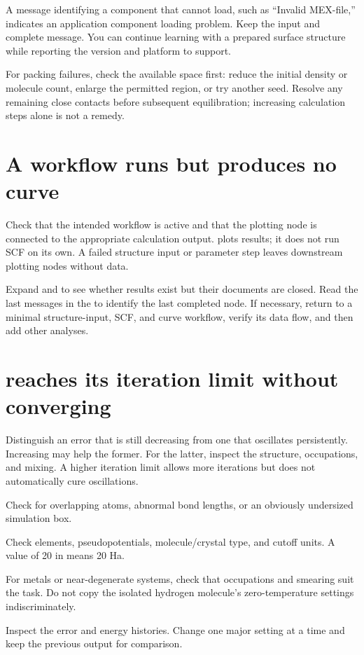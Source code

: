 A message identifying a component that cannot load, such as ``Invalid MEX-file,'' indicates an application component loading problem. Keep the input and complete message. You can continue learning with a prepared surface structure while reporting the version and platform to support.

For packing failures, check the available space first: reduce the initial density or molecule count, enlarge the permitted region, or try another seed. Resolve any remaining close contacts before subsequent equilibration; increasing calculation steps alone is not a remedy.

\section{A workflow runs but produces no curve}

Check that the intended workflow is active and that the plotting node is connected to the appropriate calculation output.  plots results; it does not run SCF on its own. A failed structure input or parameter step leaves downstream plotting nodes without data.

Expand  and  to see whether results exist but their documents are closed. Read the last messages in the  to identify the last completed node. If necessary, return to a minimal structure-input, SCF, and curve workflow, verify its data flow, and then add other analyses.

\section{ reaches its iteration limit without converging}

Distinguish an error that is still decreasing from one that oscillates persistently. Increasing  may help the former. For the latter, inspect the structure, occupations, and mixing. A higher iteration limit allows more iterations but does not automatically cure oscillations.

\begin{steps}
\item Check for overlapping atoms, abnormal bond lengths, or an obviously undersized simulation box.
\item Check elements, pseudopotentials, molecule/crystal type, and cutoff units. A value of 20 in  means 20 Ha.
\item For metals or near-degenerate systems, check that occupations and smearing suit the task. Do not copy the isolated hydrogen molecule's zero-temperature settings indiscriminately.
\item Inspect the error and energy histories. Change one major setting at a time and keep the previous output for comparison.
\end{steps}

